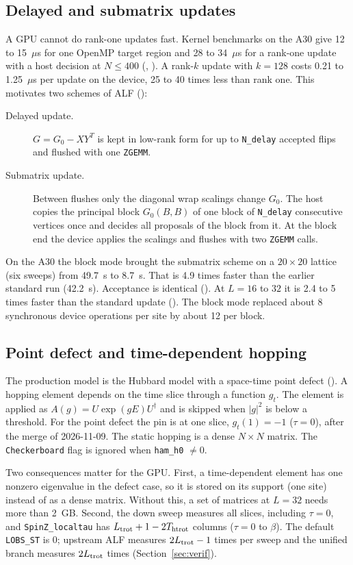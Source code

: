 \subsection{Delayed and submatrix updates}

A GPU cannot do rank-one updates fast. Kernel benchmarks on the A30 give 12 to 15~$\mu$s for one OpenMP target region and 28 to 34~$\mu$s for a rank-one update with a host decision at $N\le400$ (, ). A rank-$k$ update with $k=128$ costs 0.21 to 1.25~$\mu$s per update on the device, 25 to 40 times less than rank one. This motivates two schemes of ALF ():

\begin{description}
\item[Delayed update.] $G=G_0-XY^{T}$ is kept in low-rank form for up to \texttt{N\_delay} accepted flips and flushed with one \texttt{ZGEMM}.
\item[Submatrix update.] Between flushes only the diagonal wrap scalings change $G_0$. The host copies the principal block $G_0(B,B)$ of one block of \texttt{N\_delay} consecutive vertices once and decides all proposals of the block from it. At the block end the device applies the scalings and flushes with two \texttt{ZGEMM} calls.
\end{description}

On the A30 the block mode brought the submatrix scheme on a $20\times20$ lattice (six sweeps) from 49.7~s to 8.7~s. That is 4.9 times faster than the earlier standard run (42.2~s). Acceptance is identical (). At $L=16$ to $32$ it is 2.4 to 5 times faster than the standard update (). The block mode replaced about 8 synchronous device operations per site by about 12 per block.

\subsection{Point defect and time-dependent hopping}

The production model is the Hubbard model with a space-time point defect (). A hopping element depends on the time slice through a function $g_t$. The element is applied as $A(g)=U\exp(gE)U^\dagger$ and is skipped when $|g|^2$ is below a threshold. For the point defect the pin is at one slice, $g_t(1)=-1$ ($\tau=0$), after the merge of 2026-11-09. The static hopping is a dense $N\times N$ matrix. The \texttt{Checkerboard} flag is ignored when \texttt{ham\_h0} $\neq0$.

Two consequences matter for the GPU. First, a time-dependent element has one nonzero eigenvalue in the defect case, so it is stored on its support (one site) instead of as a dense matrix. Without this, a set of matrices at $L=32$ needs more than 2~GB. Second, the down sweep measures all slices, including $\tau=0$, and \texttt{SpinZ\_localtau} has $L_{\rm trot}+1-2T_{\rm htrot}$ columns ($\tau=0$ to $\beta$). The default \texttt{LOBS\_ST} is 0; upstream ALF measures $2L_{\rm trot}-1$ times per sweep and the unified branch measures $2L_{\rm trot}$ times (Section~\ref{sec:verif}).

